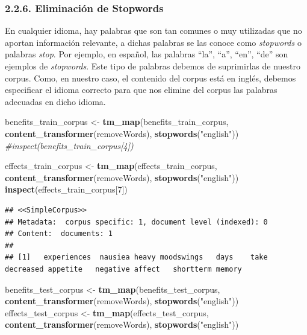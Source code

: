 \documentclass[spanish,]{article}
\newenvironment{Shaded}{\begin{snugshade}}{\end{snugshade}}
\newcommand{\KeywordTok}[1]{\textcolor[rgb]{0.13,0.29,0.53}{\textbf{#1}}}
\newcommand{\DecValTok}[1]{\textcolor[rgb]{0.00,0.00,0.81}{#1}}
\newcommand{\StringTok}[1]{\textcolor[rgb]{0.31,0.60,0.02}{#1}}
\newcommand{\CommentTok}[1]{\textcolor[rgb]{0.56,0.35,0.01}{\textit{#1}}}
\newcommand{\NormalTok}[1]{#1}
\begin{document}
\subsubsection{2.2.6. Eliminación de
Stopwords}\label{eliminacion-de-stopwords}

En cualquier idioma, hay palabras que son tan comunes o muy utilizadas
que no aportan información relevante, a dichas palabras se las conoce
como \emph{stopwords} o palabras \emph{stop}. Por ejemplo, en español,
las palabras ``la'', ``a'', ``en'', ``de'' son ejemplos de
\emph{stopwords}. Este tipo de palabras debemos de suprimirlas de
nuestro corpus. Como, en nuestro caso, el contenido del corpus está en
inglés, debemos especificar el idioma correcto para que nos elimine del
corpus las palabras adecuadas en dicho idioma.

\begin{Shaded}
\begin{Highlighting}[]
\NormalTok{benefits_train_corpus <-}\StringTok{ }\KeywordTok{tm_map}\NormalTok{(benefits_train_corpus, }\KeywordTok{content_transformer}\NormalTok{(removeWords), }\KeywordTok{stopwords}\NormalTok{(}\StringTok{"english"}\NormalTok{))}
\CommentTok{#inspect(benefits_train_corpus[4])}

\NormalTok{effects_train_corpus <-}\StringTok{ }\KeywordTok{tm_map}\NormalTok{(effects_train_corpus, }\KeywordTok{content_transformer}\NormalTok{(removeWords), }\KeywordTok{stopwords}\NormalTok{(}\StringTok{"english"}\NormalTok{))}
\KeywordTok{inspect}\NormalTok{(effects_train_corpus[}\DecValTok{7}\NormalTok{])}
\end{Highlighting}
\end{Shaded}

\begin{verbatim}
## <<SimpleCorpus>>
## Metadata:  corpus specific: 1, document level (indexed): 0
## Content:  documents: 1
## 
## [1]   experiences  nausiea heavy moodswings   days    take  decreased appetite   negative affect   shortterm memory
\end{verbatim}

\begin{Shaded}
\begin{Highlighting}[]
\NormalTok{benefits_test_corpus <-}\StringTok{ }\KeywordTok{tm_map}\NormalTok{(benefits_test_corpus, }\KeywordTok{content_transformer}\NormalTok{(removeWords), }\KeywordTok{stopwords}\NormalTok{(}\StringTok{"english"}\NormalTok{))}
\NormalTok{effects_test_corpus <-}\StringTok{ }\KeywordTok{tm_map}\NormalTok{(effects_test_corpus, }\KeywordTok{content_transformer}\NormalTok{(removeWords), }\KeywordTok{stopwords}\NormalTok{(}\StringTok{"english"}\NormalTok{))}
\end{Highlighting}
\end{Shaded}
\end{document}
